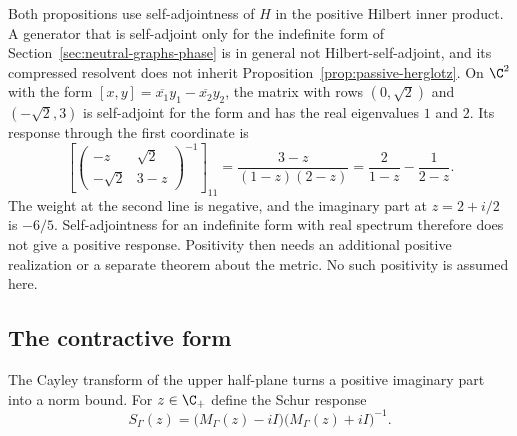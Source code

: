 Both propositions use self-adjointness of $H$ in the positive Hilbert inner product. A generator that is self-adjoint only for the indefinite form of Section~\ref{sec:neutral-graphs-phase} is in general not Hilbert-self-adjoint, and its compressed resolvent does not inherit Proposition~\ref{prop:passive-herglotz}. On $\C^2$ with the form $[x,y]=\overline{x_1}y_1-\overline{x_2}y_2$, the matrix with rows $(0,\sqrt2)$ and $(-\sqrt2,3)$ is self-adjoint for the form and has the real eigenvalues $1$ and $2$. Its response through the first coordinate is
\begin{equation}
 \left[\begin{pmatrix}-z&\sqrt2\\-\sqrt2&3-z\end{pmatrix}^{-1}\right]_{11}
   =\frac{3-z}{(1-z)(2-z)}=\frac{2}{1-z}-\frac{1}{2-z} .
 \label{eq:passive-signed-witness}
\end{equation}
The weight at the second line is negative, and the imaginary part at $z=2+i/2$ is $-6/5$. Self-adjointness for an indefinite form with real spectrum therefore does not give a positive response. Positivity then needs an additional positive realization or a separate theorem about the metric. No such positivity is assumed here.

\subsection{The contractive form}
\label{subsec:passive-cayley}

The Cayley transform of the upper half-plane turns a positive imaginary part into a norm bound. For $z\in\C_+$ define the Schur response
\begin{equation}
 S_\Gamma(z)=\bigl(M_\Gamma(z)-iI\bigr)\bigl(M_\Gamma(z)+iI\bigr)^{-1}.
 \label{eq:passive-schur-response}
\end{equation}


